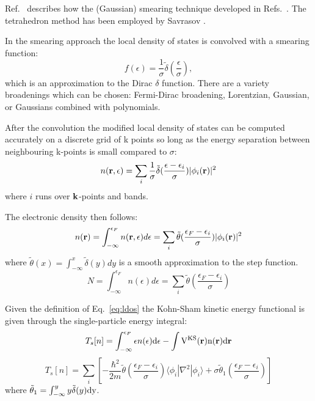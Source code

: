 \documentclass{article}
\def\r{{\bf r}}
\def\k{{\bf k}}
\def\bra{\langle}
\def\ket{\rangle}
\begin{document}
Ref.~\cite{degironcoli95} describes how the (Gaussian) smearing 
technique developed in Refs.~\cite{fu83, methfessel89}.
The tetrahedron method has been employed by Savrasov \cite{savrasov92}.

In the smearing approach the local density of states is convolved 
with a smearing function:
%
\begin{equation}
f(\epsilon)=\frac{1}{\sigma}\tilde{\delta}(\frac{\epsilon}{\sigma}),
\end{equation}
%
which is an approximation to the Dirac $\delta$ function. There
are a variety broadenings which can be chosen: Fermi-Dirac broadening, 
Lorentzian, Gaussian, or Gaussians combined with polynomials.

After the convolution the modified local density of states can be computed accurately on a discrete
grid of k points so long as the energy separation between neighbouring k-points is 
small compared to $\sigma$:
%
\begin{equation}
\label{eq:ldos}
n(\r,\epsilon) = \sum_{i} \frac{1}{\sigma} \tilde{\delta}(\frac{\epsilon-\epsilon_{i}}{\sigma})|\phi_{i}(\r)|^{2}
\end{equation}
%
where $i$ runs over $\k$-points and bands.

The electronic density then follows:
%
\begin{equation}
n(\r)=\int_{-\infty}^{\epsilon_{F}}n(\r,\epsilon)d\epsilon=\sum_{i}\tilde{\theta}(\frac{\epsilon_{F}-\epsilon_{i}}{\sigma})|\phi_{i}(\r)|^{2}
\end{equation}
%
where $\tilde{\theta}(x) = \int_{-\infty}^{x}\tilde{\delta}(y) dy$ is a smooth
approximation to the step function.
%
\begin{equation}
N = \int_{-\infty}^{\epsilon_{F}}n(\epsilon) d\epsilon = \sum_{i} \tilde{\theta}(\frac{\epsilon_{F}- \epsilon_{i}}{\sigma})
\end{equation}
%

Given the definition of Eq.~\ref{eq:ldos} the Kohn-Sham 
kinetic energy functional is given through
the single-particle energy integral:
%
\begin{equation}
T_{s}[n] = \int_{-\infty}^{\epsilon_{F}}\epsilon n(\epsilon)\rm{d}\epsilon-\int V^{KS}(\r)n(\r)d\r
\end{equation}
%
\begin{equation}
T_{s}[n] = \sum_{i} \left[ -\frac{\hbar^{2}}{2m} \tilde{\theta}(\frac{\epsilon_{F}-\epsilon_{i}}{\sigma}) \bra\phi_{i}|\nabla^{2}|\phi_{i}\ket 
+ \sigma\tilde{\theta}_{1}(\frac{\epsilon_{F}-\epsilon_{i}}{\sigma}) \right]
\end{equation}
%
where $\tilde{\theta}_{1}= \int_{-\infty}^{y}y\tilde{\delta}(y)\rm{d}y$.
\end{document}
